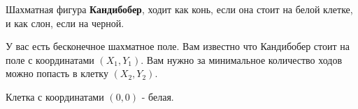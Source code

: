 Шахматная фигура \textbf{Кандибобер}, ходит как конь, если она стоит на белой клетке, и как слон, если на черной.

У вас есть бесконечное шахматное поле. Вам известно что Кандибобер стоит на поле с координатами $(X_1, Y_1)$. Вам нужно за минимальное количество ходов можно попасть в клетку $(X_2, Y_2)$.

Клетка с координатами $(0, 0)$ - белая.
